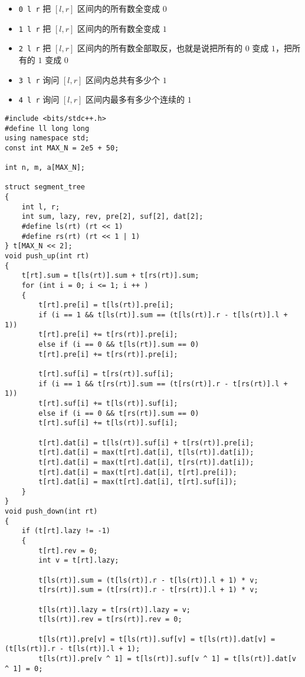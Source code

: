 \documentclass[E:/GsjzTle/main/main.tex]{subfiles}
\begin{document}
\begin{itemize}
\item
  \texttt{0\ l\ r} 把 \([l, r]\) 区间内的所有数全变成 \(0\)
\item
  \texttt{1\ l\ r} 把 \([l, r]\) 区间内的所有数全变成 \(1\)
\item
  \texttt{2\ l\ r} 把 \([l,r]\) 区间内的所有数全部取反，也就是说把所有的
  \(0\) 变成 \(1\)，把所有的 \(1\) 变成 \(0\)
\item
  \texttt{3\ l\ r} 询问 \([l, r]\) 区间内总共有多少个 \(1\)
\item
  \texttt{4\ l\ r} 询问 \([l, r]\) 区间内最多有多少个连续的 \(1\)
\end{itemize}

\begin{lstlisting}
#include <bits/stdc++.h>
#define ll long long
using namespace std;
const int MAX_N = 2e5 + 50;

int n, m, a[MAX_N];

struct segment_tree
{
	int l, r;
	int sum, lazy, rev, pre[2], suf[2], dat[2];
	#define ls(rt) (rt << 1)
	#define rs(rt) (rt << 1 | 1)
} t[MAX_N << 2];
void push_up(int rt)
{
	t[rt].sum = t[ls(rt)].sum + t[rs(rt)].sum;
	for (int i = 0; i <= 1; i ++ )
	{
		t[rt].pre[i] = t[ls(rt)].pre[i];
		if (i == 1 && t[ls(rt)].sum == (t[ls(rt)].r - t[ls(rt)].l + 1))
		t[rt].pre[i] += t[rs(rt)].pre[i];
		else if (i == 0 && t[ls(rt)].sum == 0)
		t[rt].pre[i] += t[rs(rt)].pre[i];
		
		t[rt].suf[i] = t[rs(rt)].suf[i];
		if (i == 1 && t[rs(rt)].sum == (t[rs(rt)].r - t[rs(rt)].l + 1))
		t[rt].suf[i] += t[ls(rt)].suf[i];
		else if (i == 0 && t[rs(rt)].sum == 0)
		t[rt].suf[i] += t[ls(rt)].suf[i];
		
		t[rt].dat[i] = t[ls(rt)].suf[i] + t[rs(rt)].pre[i];
		t[rt].dat[i] = max(t[rt].dat[i], t[ls(rt)].dat[i]);
		t[rt].dat[i] = max(t[rt].dat[i], t[rs(rt)].dat[i]);
		t[rt].dat[i] = max(t[rt].dat[i], t[rt].pre[i]);
		t[rt].dat[i] = max(t[rt].dat[i], t[rt].suf[i]);
	}
}
void push_down(int rt)
{
	if (t[rt].lazy != -1)
	{
		t[rt].rev = 0;
		int v = t[rt].lazy;
		
		t[ls(rt)].sum = (t[ls(rt)].r - t[ls(rt)].l + 1) * v;
		t[rs(rt)].sum = (t[rs(rt)].r - t[rs(rt)].l + 1) * v;
		
		t[ls(rt)].lazy = t[rs(rt)].lazy = v;
		t[ls(rt)].rev = t[rs(rt)].rev = 0;
		
		t[ls(rt)].pre[v] = t[ls(rt)].suf[v] = t[ls(rt)].dat[v] = (t[ls(rt)].r - t[ls(rt)].l + 1);
		t[ls(rt)].pre[v ^ 1] = t[ls(rt)].suf[v ^ 1] = t[ls(rt)].dat[v ^ 1] = 0;
		

\end{lstlisting}
\end{document}
